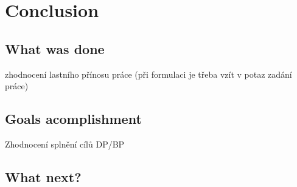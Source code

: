 	\chapter{Conclusion}
	\section{What was done}
	zhodnocení lastního přínosu práce (při formulaci je třeba vzít v potaz zadání práce)
	\section{Goals acomplishment}
	Zhodnocení splnění cílů DP/BP
	\section{What next?}